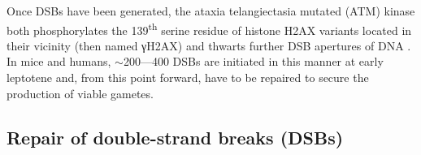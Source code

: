 Once DSBs have been generated, the ataxia telangiectasia mutated (ATM) kinase both phosphorylates the 139\textsuperscript{th} serine residue of histone H2AX variants located in their vicinity (then named \textgreek{γ}H2AX) \citep{rogakou1998dna,burma2001atm} and thwarts further DSB apertures of DNA \citep{lange2011atm,lukaszewicz2018control}.\\

In mice and humans, ${\sim}$200—400 DSBs are initiated in this manner at early leptotene and, from this point forward, have to be repaired to secure the production of viable gametes.







\subsection{Repair of double-strand breaks (DSBs)}
\label{chap2:DSB-repair}

